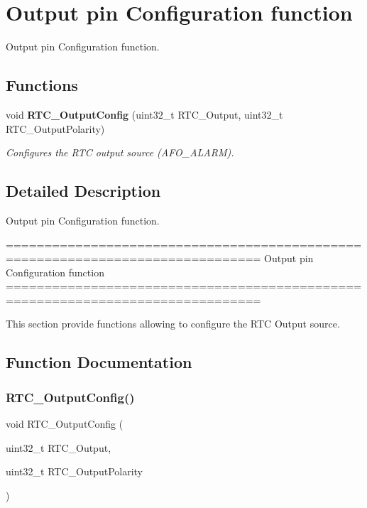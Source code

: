 \section{Output pin Configuration function}
\label{group__RTC__Group6}


Output pin Configuration function.  


\subsection*{Functions}
\begin{DoxyCompactItemize}
\item 
void \textbf{ R\+T\+C\+\_\+\+Output\+Config} (uint32\+\_\+t R\+T\+C\+\_\+\+Output, uint32\+\_\+t R\+T\+C\+\_\+\+Output\+Polarity)
\begin{DoxyCompactList}\small\item\em Configures the R\+TC output source (A\+F\+O\+\_\+\+A\+L\+A\+RM). \end{DoxyCompactList}\end{DoxyCompactItemize}


\subsection{Detailed Description}
Output pin Configuration function. 

\begin{DoxyVerb} ===============================================================================
                         Output pin Configuration function
 ===============================================================================  

  This section provide functions allowing to configure the RTC Output source.\end{DoxyVerb}
 

\subsection{Function Documentation}
\mbox{\label{group__RTC__Group6_gae3165ef19ef3bd63789e59130ad8d89b}} 
\subsubsection{R\+T\+C\+\_\+\+Output\+Config()}
{\footnotesize\ttfamily void R\+T\+C\+\_\+\+Output\+Config (\begin{DoxyParamCaption}\item[{uint32\+\_\+t}]{R\+T\+C\+\_\+\+Output,  }\item[{uint32\+\_\+t}]{R\+T\+C\+\_\+\+Output\+Polarity }\end{DoxyParamCaption})}



